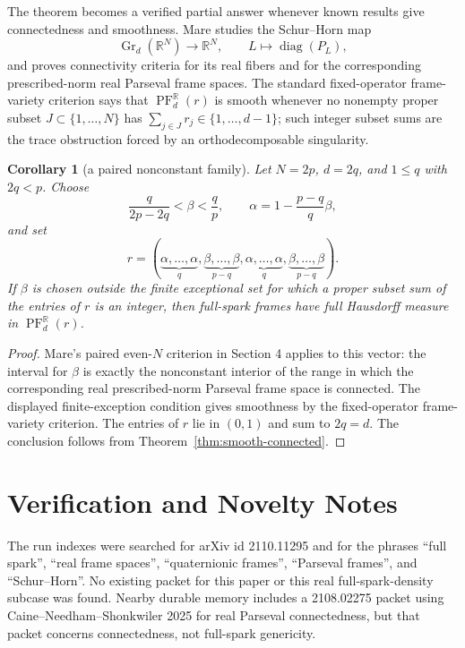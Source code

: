 \documentclass[11pt]{article}
\newtheorem{corollary}[theorem]{Corollary}
\newcommand{\R}{\mathbb R}
\newcommand{\Gr}{\operatorname{Gr}}
\newcommand{\PF}{\operatorname{PF}}
\newcommand{\diag}{\operatorname{diag}}
\begin{document}
The theorem becomes a verified partial answer whenever known results give connectedness and smoothness. Mare studies the Schur--Horn map
\[
\Gr_d(\R^N)\to\R^N,\qquad L\mapsto \diag(P_L),
\]
and proves connectivity criteria for its real fibers and for the corresponding prescribed-norm real Parseval frame spaces. The standard fixed-operator frame-variety criterion says that \(\PF_d^{\R}(r)\) is smooth whenever no nonempty proper subset \(J\subset\{1,\ldots,N\}\) has \(\sum_{j\in J}r_j\in\{1,\ldots,d-1\}\); such integer subset sums are the trace obstruction forced by an orthodecomposable singularity.

\begin{corollary}[a paired nonconstant family]\label{cor:paired}
Let \(N=2p\), \(d=2q\), and \(1\le q\) with \(2q<p\). Choose
\[
 \frac{q}{2p-2q}<\beta<\frac{q}{p},
 \qquad
 \alpha=1-\frac{p-q}{q}\beta,
\]
and set
\[
 r=(\underbrace{\alpha,\ldots,\alpha}_{q},
      \underbrace{\beta,\ldots,\beta}_{p-q},
      \underbrace{\alpha,\ldots,\alpha}_{q},
      \underbrace{\beta,\ldots,\beta}_{p-q}).
\]
If \(\beta\) is chosen outside the finite exceptional set for which a proper subset sum of the entries of \(r\) is an integer, then full-spark frames have full Hausdorff measure in \(\PF_d^{\R}(r)\).
\end{corollary}

\begin{proof}
Mare's paired even-\(N\) criterion in Section 4 applies to this vector: the interval for \(\beta\) is exactly the nonconstant interior of the range in which the corresponding real prescribed-norm Parseval frame space is connected. The displayed finite-exception condition gives smoothness by the fixed-operator frame-variety criterion. The entries of \(r\) lie in \((0,1)\) and sum to \(2q=d\). The conclusion follows from Theorem~\ref{thm:smooth-connected}.
\end{proof}

\section{Verification and Novelty Notes}

The run indexes were searched for arXiv id 2110.11295 and for the phrases ``full spark'', ``real frame spaces'', ``quaternionic frames'', ``Parseval frames'', and ``Schur--Horn''. No existing packet for this paper or this real full-spark-density subcase was found. Nearby durable memory includes a 2108.02275 packet using Caine--Needham--Shonkwiler 2025 for real Parseval connectedness, but that packet concerns connectedness, not full-spark genericity.
\end{document}
